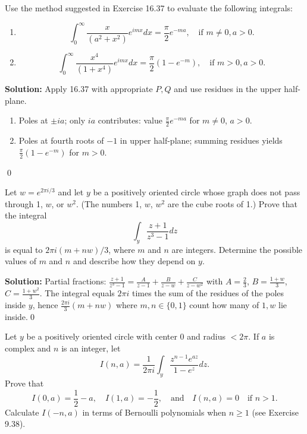 \begin{problembox}
Use the method suggested in Exercise 16.37 to evaluate the following integrals:
\begin{enumerate}[label=(\alph*)]
\item \[ \int_0^{\infty} \frac{x}{(a^2 + x^2)} e^{imx} dx = \frac{\pi}{2} e^{-ma}, \quad \text{if } m \neq 0, a > 0. \]
\item \[ \int_0^{\infty} \frac{x^4}{(1 + x^4)} e^{imx} dx = \frac{\pi}{2} (1 - e^{-m}), \quad \text{if } m > 0, a > 0. \]
\end{enumerate}
\end{problembox}

\bigskip\noindent\textbf{Solution:}
Apply 16.37 with appropriate $P,Q$ and use residues in the upper half-plane.
\begin{enumerate}[label=(\alph*)]
\item Poles at $\pm ia$; only $ia$ contributes: value $\frac{\pi}{2}e^{-ma}$ for $m\ne0$, $a>0$.
\item Poles at fourth roots of $-1$ in upper half-plane; summing residues yields $\frac{\pi}{2}(1-e^{-m})$ for $m>0$.
\end{enumerate}\qed


\begin{problembox}
Let \( w = e^{2\pi i / 3} \) and let \( y \) be a positively oriented circle whose graph does not pass through 1, \( w \), or \( w^2 \). (The numbers 1, \( w \), \( w^2 \) are the cube roots of 1.) Prove that the integral
\[ \int_y \frac{z + 1}{z^3 - 1} dz \]
is equal to \( 2\pi i (m + n w) / 3 \), where \( m \) and \( n \) are integers. Determine the possible values of \( m \) and \( n \) and describe how they depend on \( y \).
\end{problembox}

\bigskip\noindent\textbf{Solution:}
Partial fractions: $\frac{z+1}{z^3-1}=\frac{A}{z-1}+\frac{B}{z-w}+\frac{C}{z-w^2}$ with $A=\tfrac{2}{3}$, $B=\tfrac{1+w}{3}$, $C=\tfrac{1+w^2}{3}$. The integral equals $2\pi i$ times the sum of the residues of the poles inside $y$, hence $\frac{2\pi i}{3}(m+n w)$ where $m,n\in\{0,1\}$ count how many of $1,w$ lie inside.\qed


\begin{problembox}
Let \( y \) be a positively oriented circle with center 0 and radius \( < 2\pi \). If \( a \) is complex and \( n \) is an integer, let
\[ I(n, a) = \frac{1}{2\pi i} \int_y \frac{z^{n-1} e^{az}}{1 - e^z} dz. \]
Prove that
\[ I(0, a) = \frac{1}{2} - a, \quad I(1, a) = -\frac{1}{2}, \quad \text{and} \quad I(n, a) = 0 \quad \text{if } n > 1. \]
Calculate \( I(-n, a) \) in terms of Bernoulli polynomials when \( n \geq 1 \) (see Exercise 9.38).
\end{problembox}

